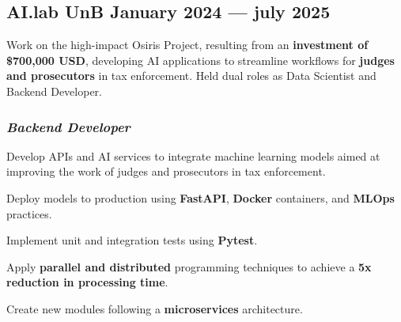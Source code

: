 \documentclass[a4paper,12pt]{article}
\begin{document}

\subsection*{\large AI.lab UnB \hfill January 2024 --- july 2025}
\vspace{0.5em}

Work on the high-impact Osiris Project, resulting from an \textbf{investment of \$700,000 USD}, developing AI applications to streamline workflows for \textbf{judges and prosecutors} in tax enforcement. Held dual roles as Data Scientist and Backend Developer.

\subsubsection*{\small \textit{Backend Developer}}
\vspace{-1.3em}
\vspace{-0.5em}
\begin{zitemize}
    \item Develop APIs and AI services to integrate machine learning models aimed at improving the work of judges and prosecutors in tax enforcement.
    \item Deploy models to production using \textbf{FastAPI}, \textbf{Docker} containers, and \textbf{MLOps} practices.
    \item Implement unit and integration tests using \textbf{Pytest}.
    \item Apply \textbf{parallel and distributed} programming techniques to achieve a \textbf{5x reduction in processing time}.
    \item Create new modules following a \textbf{microservices} architecture.
\end{zitemize}
\end{document}
